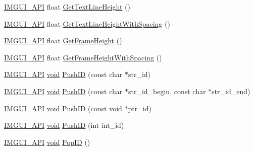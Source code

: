 \begin{DoxyCompactItemize}
\item 
\hyperlink{imgui_8h_a43829975e84e45d1149597467a14bbf5}{I\+M\+G\+U\+I\+\_\+\+A\+PI} float \hyperlink{namespaceImGui_aaba5637199d31ea23d4d143b30a44aff}{Get\+Text\+Line\+Height} ()
\item 
\hyperlink{imgui_8h_a43829975e84e45d1149597467a14bbf5}{I\+M\+G\+U\+I\+\_\+\+A\+PI} float \hyperlink{namespaceImGui_aa1616f6082fd210fde8d98c511bf8f56}{Get\+Text\+Line\+Height\+With\+Spacing} ()
\item 
\hyperlink{imgui_8h_a43829975e84e45d1149597467a14bbf5}{I\+M\+G\+U\+I\+\_\+\+A\+PI} float \hyperlink{namespaceImGui_ae560f17cf3262017cee888d1eb77f294}{Get\+Frame\+Height} ()
\item 
\hyperlink{imgui_8h_a43829975e84e45d1149597467a14bbf5}{I\+M\+G\+U\+I\+\_\+\+A\+PI} float \hyperlink{namespaceImGui_a8de260eebd333718fa0c3b6c80258c67}{Get\+Frame\+Height\+With\+Spacing} ()
\item 
\hyperlink{imgui_8h_a43829975e84e45d1149597467a14bbf5}{I\+M\+G\+U\+I\+\_\+\+A\+PI} \hyperlink{imgui__impl__opengl3__loader_8h_ac668e7cffd9e2e9cfee428b9b2f34fa7}{void} \hyperlink{namespaceImGui_a27a8533605dc5b8cabf161bf7715bbde}{Push\+ID} (const char $\ast$str\+\_\+id)
\item 
\hyperlink{imgui_8h_a43829975e84e45d1149597467a14bbf5}{I\+M\+G\+U\+I\+\_\+\+A\+PI} \hyperlink{imgui__impl__opengl3__loader_8h_ac668e7cffd9e2e9cfee428b9b2f34fa7}{void} \hyperlink{namespaceImGui_af5e55788830807a7c53d5dd7865b692a}{Push\+ID} (const char $\ast$str\+\_\+id\+\_\+begin, const char $\ast$str\+\_\+id\+\_\+end)
\item 
\hyperlink{imgui_8h_a43829975e84e45d1149597467a14bbf5}{I\+M\+G\+U\+I\+\_\+\+A\+PI} \hyperlink{imgui__impl__opengl3__loader_8h_ac668e7cffd9e2e9cfee428b9b2f34fa7}{void} \hyperlink{namespaceImGui_af9cf42fdf2fbc5eeec7521de14996bfb}{Push\+ID} (const \hyperlink{imgui__impl__opengl3__loader_8h_ac668e7cffd9e2e9cfee428b9b2f34fa7}{void} $\ast$ptr\+\_\+id)
\item 
\hyperlink{imgui_8h_a43829975e84e45d1149597467a14bbf5}{I\+M\+G\+U\+I\+\_\+\+A\+PI} \hyperlink{imgui__impl__opengl3__loader_8h_ac668e7cffd9e2e9cfee428b9b2f34fa7}{void} \hyperlink{namespaceImGui_a6a11664be2a0b9a0e7054bb339e009ac}{Push\+ID} (int int\+\_\+id)
\item 
\hyperlink{imgui_8h_a43829975e84e45d1149597467a14bbf5}{I\+M\+G\+U\+I\+\_\+\+A\+PI} \hyperlink{imgui__impl__opengl3__loader_8h_ac668e7cffd9e2e9cfee428b9b2f34fa7}{void} \hyperlink{namespaceImGui_aba0b2d8f890a5d435ae43d0c4a2d4dd1}{Pop\+ID} ()
\item 

\end{DoxyCompactItemize}
